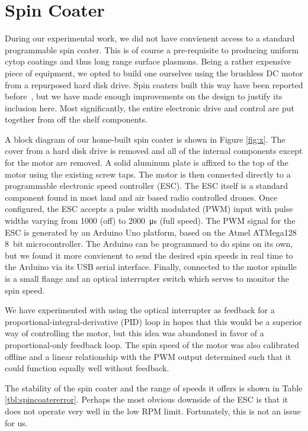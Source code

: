 \documentclass[a4paper,titlepage,onecolumn]{report}
\newcommand{\Figure}[1]{Figure \ref{#1}}
\newcommand{\Table}[1]{Table \ref{#1}}
\begin{document}
\section{Spin Coater}
During our experimental work, we did not have convienent access to a
standard programmable spin coater.  This is of course a pre-requisite to
producing uniform cytop coatings and thus long range surface plasmons.
Being a rather expensive piece of equipment, we opted to build one
ourselves using the brushless DC motor from a repurposed hard disk drive.
Spin coaters built this way have been reported
before~\cite{bianchi2006spin}, but we have made enough improvements on the
design to justify its inclusion here.  Most significantly, the entire
electronic drive and control are put together from off the shelf
components.

A block diagram of our home-built spin coater is shown in \Figure{fig:x}.
The cover from a hard disk drive is removed and all of the internal
components except for the motor are removed.  A solid aluminum plate is
affixed to the top of the motor using the existing screw taps.  The motor
is then connected directly to a programmable electronic speed controller
(ESC).  The ESC itself is a standard component found in most land and air
based radio controlled drones.  Once configured, the ESC accepts a pulse
width modulated (PWM) input with pulse widths varying from \num{1000} (off)
to \SI{2000}{\micro\second} (full speed).  The PWM signal for the ESC is
generated by an Arduino Uno platform, based on the Atmel ATMega128
\SI{8}{bit} microcontroller.  The Arduino can be programmed to do spins on
its own, but we found it more convienent to send the desired spin speeds in
real time to the Arduino via its USB serial interface.  Finally, connected
to the motor spindle is a small flange and an optical interrupter switch
which serves to monitor the spin speed.  

We have experimented with using the optical interrupter as feedback for a
proportional-integral-derivative (PID) loop in hopes that this would be a
superior way of controlling the motor, but this idea was abandoned in favor
of a proportional-only feedback loop.  The spin speed of the motor was also
calibrated offline and a linear relationship with the PWM output determined
such that it could function equally well without feedback.  

The stability of the spin coater and the range of speeds it offers is shown
in \Table{tbl:spincoatererror}.  Perhaps the most obvious downside of the
ESC is that it does not operate very well in the low RPM limit.
Fortunately, this is not an issue for us.
\end{document}
